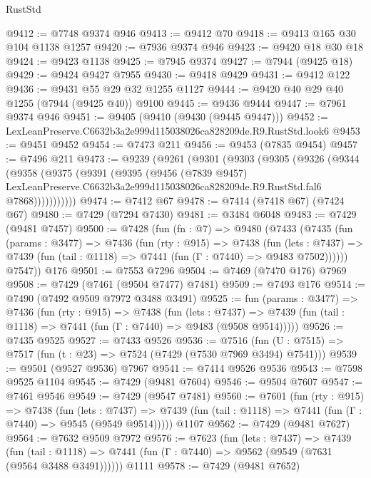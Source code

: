 \begin{lexlean}{RustStd}
\begin{coremodule}
@9412 := @7748 @9374 @946
@9413 := @9412 @70
@9418 := @9413 @165 @30 @104 @1138 @1257
@9420 := @7936 @9374 @946
@9423 := @9420 @18 @30 @18
@9424 := @9423 @1138
@9425 := @7945 @9374
@9427 := @7944 (@9425 @18)
@9429 := @9424 @9427 @7955
@9430 := @9418 @9429
@9431 := @9412 @122
@9436 := @9431 @55 @29 @32 @1255 @1127
@9444 := @9420 @40 @29 @40 @1255 (@7944 (@9425 @40)) @9100
@9445 := @9436 @9444
@9447 := @7961 @9374 @946
@9451 := @9405 (@9410 (@9430 (@9445 @9447)))
@9452 := LexLeanPreserve.C6632b3a2e999d115038026ca828209de.R9.RustStd.look6
@9453 := @9451 @9452
@9454 := @7473 @211
@9456 := @9453 (@7835 @9454)
@9457 := @7496 @211
@9473 := @9239
    (@9261
      (@9301
        (@9303
          (@9305
            (@9326
              (@9344
                (@9358
                  (@9375
                    (@9391
                      (@9395
                        (@9456
                          (@7839 @9457)
                          LexLeanPreserve.C6632b3a2e999d115038026ca828209de.R9.RustStd.fal6
                          @7868)))))))))))
@9474 := @7412 @67
@9478 := @7414 (@7418 @67) (@7424 @67)
@9480 := @7429 (@7294 @7430)
@9481 := @3484 @6048
@9483 := @7429 (@9481 @7457)
@9500 := @7428
    (fun (fn : @7) =>
    @9480
      (@7433
        (@7435
          (fun (params : @3477) =>
          @7436
            (fun (rty : @915) =>
            @7438
              (fun (lets : @7437) =>
              @7439 (fun (tail : @1118) => @7441 (fun (Γ : @7440) => @9483 @7502))))))
        @7547))
    @176
@9501 := @7553 @7296
@9504 := @7469 (@7470 @176) @7969
@9508 := @7429 (@7461 (@9504 @7477) @7481)
@9509 := @7493 @176
@9514 := @7490 (@7492 @9509 @7972 @3488 @3491)
@9525 := fun (params : @3477) =>
  @7436
    (fun (rty : @915) =>
    @7438
      (fun (lets : @7437) =>
      @7439 (fun (tail : @1118) => @7441 (fun (Γ : @7440) => @9483 (@9508 @9514)))))
@9526 := @7435 @9525
@9527 := @7433 @9526
@9536 := @7516 (fun (U : @7515) => @7517 (fun (t : @23) => @7524 (@7429 (@7530 @7969 @3494) @7541)))
@9539 := @9501 (@9527 @9536) @7967
@9541 := @7414 @9526 @9536
@9543 := @7598 @9525 @1104
@9545 := @7429 (@9481 @7604)
@9546 := @9504 @7607
@9547 := @7461 @9546
@9549 := @7429 (@9547 @7481)
@9560 := @7601
    (fun (rty : @915) =>
    @7438
      (fun (lets : @7437) =>
      @7439 (fun (tail : @1118) => @7441 (fun (Γ : @7440) => @9545 (@9549 @9514)))))
    @1107
@9562 := @7429 (@9481 @7627)
@9564 := @7632 @9509 @7972
@9576 := @7623
    (fun (lets : @7437) =>
    @7439
      (fun (tail : @1118) => @7441 (fun (Γ : @7440) => @9562 (@9549 (@7631 (@9564 @3488 @3491))))))
    @1111
@9578 := @7429 (@9481 @7652)

\end{coremodule}
\end{lexlean}

